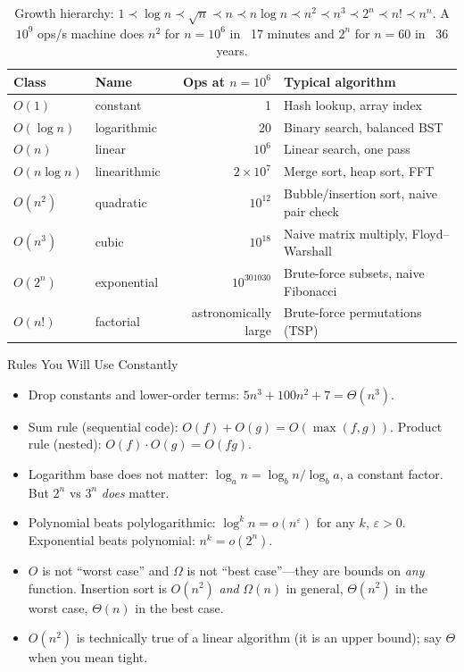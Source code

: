 \documentclass[11pt,a4paper]{article}
\begin{document}
\begin{table}[h!]
\centering
\small
{}
\begin{tabular}{|l|l|r|l|}
\hline
\rowcolor{NavyPrimary}\color{white}\textbf{Class} & \color{white}\textbf{Name} & \color{white}\textbf{Ops at $n = 10^6$} & \color{white}\textbf{Typical algorithm} \\ \hline
$O(1)$ & constant & 1 & Hash lookup, array index \\ \hline
$O(\log n)$ & logarithmic & 20 & Binary search, balanced BST \\ \hline
$O(n)$ & linear & $10^6$ & Linear search, one pass \\ \hline
$O(n \log n)$ & linearithmic & $2\times 10^7$ & Merge sort, heap sort, FFT \\ \hline
$O(n^2)$ & quadratic & $10^{12}$ & Bubble/insertion sort, naive pair check \\ \hline
$O(n^3)$ & cubic & $10^{18}$ & Naive matrix multiply, Floyd--Warshall \\ \hline
$O(2^n)$ & exponential & $10^{301030}$ & Brute-force subsets, naive Fibonacci \\ \hline
$O(n!)$ & factorial & astronomically large & Brute-force permutations (TSP) \\ \hline
\end{tabular}
\caption{Growth hierarchy: $1 \prec \log n \prec \sqrt n \prec n \prec n\log n \prec n^2 \prec n^3 \prec 2^n \prec n! \prec n^n$. A $10^9$ ops/s machine does $n^2$ for $n = 10^6$ in ~17 minutes and $2^n$ for $n = 60$ in ~36 years.}
\end{table}

\begin{examtip}{Rules You Will Use Constantly}
\begin{itemize}
    \item Drop constants and lower-order terms: $5n^3 + 100n^2 + 7 = \Theta(n^3)$.
    \item Sum rule (sequential code): $O(f) + O(g) = O(\max(f, g))$. Product rule (nested): $O(f)\cdot O(g) = O(fg)$.
    \item Logarithm base does not matter: $\log_a n = \log_b n / \log_b a$, a constant factor. But $2^n$ vs $3^n$ \emph{does} matter.
    \item Polynomial beats polylogarithmic: $\log^k n = o(n^\varepsilon)$ for any $k$, $\varepsilon > 0$. Exponential beats polynomial: $n^k = o(2^n)$.
    \item $O$ is not ``worst case'' and $\Omega$ is not ``best case''---they are bounds on \emph{any} function. Insertion sort is $O(n^2)$ \emph{and} $\Omega(n)$ in general, $\Theta(n^2)$ in the worst case, $\Theta(n)$ in the best case.
    \item $O(n^2)$ is technically true of a linear algorithm (it is an upper bound); say $\Theta$ when you mean tight.
\end{itemize}
\end{examtip}
\end{document}
